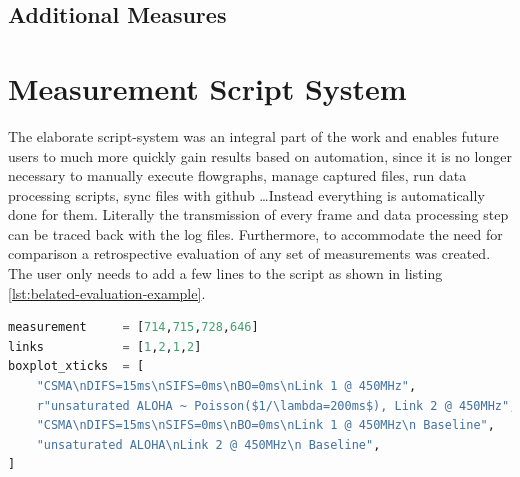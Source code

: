 \subsection{Additional Measures}

\section{Measurement Script System}
\label{sec:script-system}

The elaborate script-system was an integral part of the work and enables future users to much more quickly gain results based on automation, since it is no longer necessary to manually execute flowgraphs, manage captured files, run data processing scripts, sync files with github \ldots Instead everything is automatically done for them. Literally the transmission of every frame and data processing step can be traced back with the log files. Furthermore, to accommodate the need for comparison a retrospective evaluation of any set of measurements  was created. The user only needs to add a few lines to the script as shown in listing \ref{lst:belated-evaluation-example}.
  
\begin{lstlisting}[language=Python,caption=Evaluation of measurements with \code{belated\_evaluation.py}. In \code{links} we denote the link we used in the corresponding measurement (compare figure \ref{fig:measurement-setup}),label=lst:belated-evaluation-example]
measurement     = [714,715,728,646]
links           = [1,2,1,2]
boxplot_xticks  = [
	"CSMA\nDIFS=15ms\nSIFS=0ms\nBO=0ms\nLink 1 @ 450MHz",
    r"unsaturated ALOHA ~ Poisson($1/\lambda=200ms$), Link 2 @ 450MHz",
    "CSMA\nDIFS=15ms\nSIFS=0ms\nBO=0ms\nLink 1 @ 450MHz\n Baseline",
    "unsaturated ALOHA\nLink 2 @ 450MHz\n Baseline",
]
\end{lstlisting}

